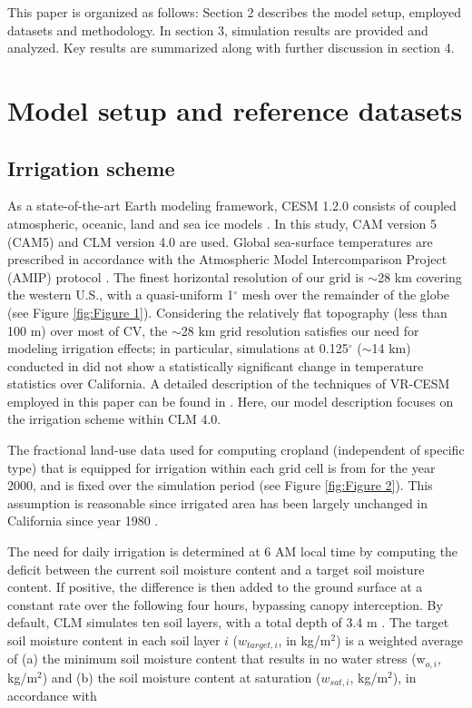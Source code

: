 \documentclass[draft,ms]{agutex}   %
\begin{document}
\begin{article}
This paper is organized as follows: Section 2 describes the model setup, employed datasets and methodology. In section 3, simulation results are provided and analyzed. Key results are summarized along with further discussion in section 4.

\section{Model setup and reference datasets}

\subsection{Irrigation scheme}

As a state-of-the-art Earth modeling framework, CESM 1.2.0 consists of coupled atmospheric, oceanic, land and sea ice models \citep{CAM5Tech, hurrell2013community}. In this study, CAM version 5 (CAM5) \citep{CAM5Tech} and CLM version 4.0 \citep{CLM40Tech} are used.  Global sea-surface temperatures are prescribed in accordance with the Atmospheric Model Intercomparison Project (AMIP) protocol \citep{Gates1992}.  The finest horizontal resolution of our grid is $\sim$28 km covering the western U.S., with a quasi-uniform 1$^\circ$ mesh over the remainder of the globe (see Figure \ref{fig:Figure 1}). Considering the relatively flat topography (less than 100 m) over most of CV, the $\sim$28 km grid resolution satisfies our need for modeling irrigation effects; in particular, simulations at 0.125$^\circ$ ($\sim$14 km) conducted in \cite{huang2016evaluation} did not show a statistically significant change in temperature statistics over California. A detailed description of the techniques of VR-CESM employed in this paper can be found in \cite{rhoades2015characterizing}. Here, our model description focuses on the irrigation scheme within CLM 4.0.

The fractional land-use data used for computing cropland (independent of specific type) that is equipped for irrigation within each grid cell is from \citet{siebert2005development} for the year 2000, and is fixed over the simulation period (see Figure \ref{fig:Figure 2}). This assumption is reasonable since irrigated area has been largely unchanged in California since year 1980 \citep{bonfils2007empirical}. 

The need for daily irrigation is determined at 6 AM local time by computing the deficit between the current soil moisture content and a target soil moisture content. If positive, the difference is then added to the ground surface at a constant rate over the following four hours, bypassing canopy interception. By default, CLM simulates ten soil layers, with a total depth of 3.4 m \citep{CLM40Tech}. The target soil moisture content in each soil layer $i$ ($w_{target, i}$, in kg/m$^2$) is a weighted average of (a) the minimum soil moisture content that results in no water stress (w$_{o,i}$, kg/m$^2$) and (b) the soil moisture content at saturation ($w_{sat,i}$, kg/m$^2$), in accordance with


\end{article}
\end{document}
